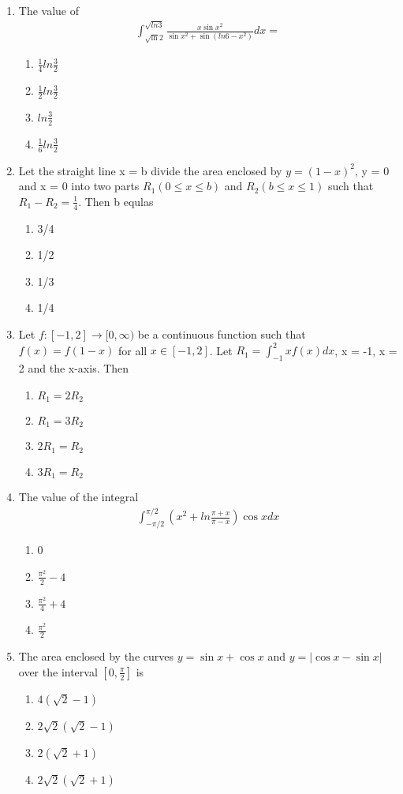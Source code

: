 \begin{enumerate}[label=\arabic*.,ref=\thesubsection.\theenumi]
\item The value of 
\begin{align*}
\int_{\sqrt\ln2}^{\sqrt{ln3}}\frac{x\sin x^2}{\sin x^2 + \sin(ln6 - x^2)}dx = 
\end{align*}
\begin{enumerate}
\item $\frac{1}{4}ln\frac{3}{2}$
\item $\frac{1}{2}ln\frac{3}{2}$
\item $ln\frac{3}{2}$
\item $\frac{1}{6}ln\frac{3}{2}$
\end{enumerate}

\item Let the straight line x = b divide the area enclosed by $y = (1 - x)^2$, y = 0 and x = 0 into two parts $R_1(0 \leq x \leq b)$ and $R_2(b \leq x \leq 1)$ such that $R_1 - R_2  = \frac{1}{4}$. Then b equlas
\begin{enumerate}
\item 3/4
\item 1/2
\item 1/3
\item 1/4
\end{enumerate}

\item Let $f: [-1, 2] \to [0, \infty)$ be a continuous function such that $f(x) = f(1 - x)$ for all $x \in [-1, 2]$. Let 
$R_1 = \int_{-1}^{2}xf(x)dx$, x = -1, x = 2 and the x-axis. Then
\begin{enumerate}
\item $R_1 = 2R_2$
\item $R_1 = 3R_2$
\item $2R_1 = R_2$
\item $3R_1 = R_2$
\end{enumerate}

\item The value of the integral
\begin{align*}
\int_{-\pi/2}^{\pi/2}(x^2 + ln\frac{\pi + x}{\pi - x})\cos x dx
\end{align*}
\begin{enumerate}
\item 0
\item $\frac{\pi^2}{2} - 4$
\item $\frac{\pi^2}{4} + 4$
\item $\frac{\pi^2}{2}$
\end{enumerate}

\item The area enclosed by the curves $y = \sin x + \cos x$ and $y = |\cos x - \sin x|$ over the interval $[0, \frac{\pi}{2}]$ is
\begin{enumerate}
\item $4(\sqrt{2} - 1)$
\item $2\sqrt{2}(\sqrt{2} - 1)$
\item $2(\sqrt{2} + 1)$
\item $2\sqrt{2}(\sqrt{2} + 1)$
\end{enumerate}


\end{enumerate}
